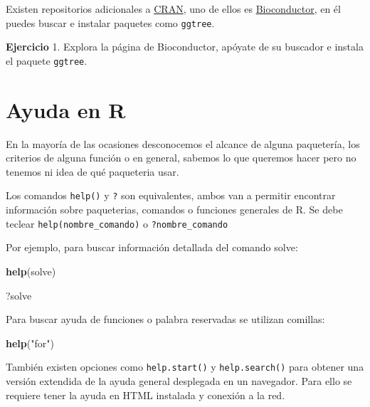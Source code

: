 \documentclass[
]{book}
\newenvironment{Shaded}{\begin{snugshade}}{\end{snugshade}}
\newcommand{\FunctionTok}[1]{\textcolor[rgb]{0.13,0.29,0.53}{\textbf{#1}}}
\newcommand{\NormalTok}[1]{#1}
\newcommand{\StringTok}[1]{\textcolor[rgb]{0.31,0.60,0.02}{#1}}
\begin{document}
Existen repositorios adicionales a \href{https://cran.r-project.org/}{CRAN}, uno de ellos es \href{https://https://bioconductor.org/}{Bioconductor}, en él puedes buscar e instalar paquetes como \texttt{ggtree}.

\textbf{Ejercicio}
1. Explora la página de Bioconductor, apóyate de su buscador e instala el paquete \texttt{ggtree}.

\hypertarget{ayuda-en-r}{%
\section{Ayuda en R}\label{ayuda-en-r}}

En la mayoría de las ocasiones desconocemos el alcance de alguna paquetería, los criterios de alguna función o en general, sabemos lo que queremos hacer pero no tenemos ni idea de qué paqueteria usar.

Los comandos \texttt{help()} y \texttt{?} son equivalentes, ambos van a permitir encontrar información sobre paqueterias, comandos o funciones generales de R. Se debe teclear \texttt{help(nombre\_comando)} o \texttt{?nombre\_comando}

Por ejemplo, para buscar información detallada del comando solve:

\begin{Shaded}
\begin{Highlighting}[]
\FunctionTok{help}\NormalTok{(solve)}
\end{Highlighting}
\end{Shaded}

\begin{Shaded}
\begin{Highlighting}[]
\NormalTok{?solve}
\end{Highlighting}
\end{Shaded}

Para buscar ayuda de funciones o palabra reservadas se utilizan comillas:

\begin{Shaded}
\begin{Highlighting}[]
\FunctionTok{help}\NormalTok{(}\StringTok{"for"}\NormalTok{)}
\end{Highlighting}
\end{Shaded}

También existen opciones como \texttt{help.start()} y \texttt{help.search()} para obtener una versión extendida de la ayuda general desplegada en un navegador. Para ello se requiere tener la ayuda en HTML instalada y conexión a la red.
\end{document}
